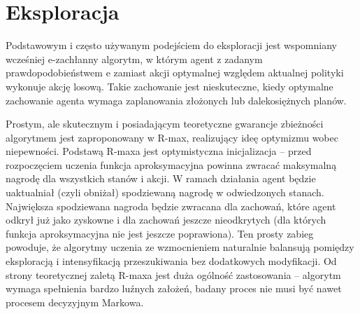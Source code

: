 \section{Eksploracja}

Podstawowym i często używanym podejściem do eksploracji jest wspomniany wcześniej e-zachłanny algorytm, w którym agent z zadanym prawdopodobieństwem e zamiast akcji optymalnej względem aktualnej polityki wykonuje akcję losową. Takie zachowanie jest nieskuteczne, kiedy optymalne zachowanie agenta wymaga zaplanowania złożonych lub dalekosiężnych planów.

Prostym, ale skutecznym i posiadającym teoretyczne gwarancje zbieżności algorytmem jest zaproponowany w \cite{brafman02} R-max, realizujący ideę optymizmu wobec niepewności. Podstawą R-maxa jest optymistyczna inicjalizacja – przed rozpoczęciem uczenia funkcja aproksymacyjna powinna zwracać maksymalną nagrodę dla wszystkich stanów i akcji. W ramach działania agent będzie uaktualniał (czyli obniżał) spodziewaną nagrodę w odwiedzonych stanach. Największa spodziewana nagroda będzie zwracana dla zachowań, które agent odkrył już jako zyskowne i dla zachowań jeszcze nieodkrytych (dla których funkcja aproksymacyjna nie jest jeszcze poprawiona). Ten prosty zabieg powoduje, że algorytmy uczenia ze wzmocnieniem naturalnie balansują pomiędzy eksploracją i intensyfikacją przeszukiwania bez dodatkowych modyfikacji. Od strony teoretycznej zaletą R-maxa jest duża ogólność zastosowania – algorytm wymaga spełnienia bardzo luźnych założeń, badany proces nie musi być nawet procesem decyzyjnym Markowa.

